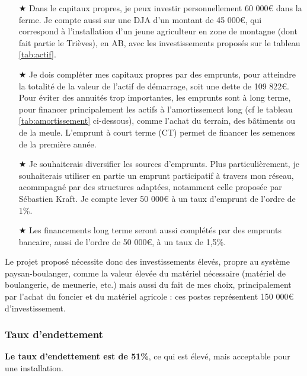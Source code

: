 \documentclass{book}
\begin{document}
\begin{itemize}

	\item[$\bigstar$] Dans le capitaux propres, je peux investir personnellement 60 000\euro{} dans la ferme. Je compte aussi sur une DJA d'un montant de 45 000\euro{}, qui correspond à l'installation d'un jeune agriculteur en zone de montagne (dont fait partie le Trièves), en AB, avec les investissements proposés sur le tableau \ref{tab:actif}.
	
	\item[$\bigstar$] Je dois compléter mes capitaux propres par des emprunts, pour atteindre la totalité de la valeur de l'actif de démarrage, soit une dette de 109 822\euro{}. Pour éviter des annuités trop importantes, les emprunts sont à long terme, pour financer principalement les actifs à l'amortissement long (cf le tableau \ref{tab:amortissement} ci-dessous), comme l'achat du terrain, des bâtiments ou de la meule. L'emprunt à court terme (CT) permet de financer les semences de la première année.
	
	\item[$\bigstar$] Je souhaiterais diversifier les sources d'emprunts. Plus particulièrement, je souhaiterais utiliser en partie un emprunt participatif à travers mon réseau, acommpagné par des structures adaptées, notamment celle proposée par Sébastien Kraft. Je compte lever 50 000\euro{} à un taux d'emprunt de l'ordre de 1\%.
	
	\item[$\bigstar$] Les financements long terme seront aussi complétés par des emprunts bancaire, aussi de l'ordre de 50 000\euro{}, à un taux de 1,5\%.

\end{itemize}

Le projet proposé nécessite donc des investissements élevés, propre au système paysan-boulanger, comme la valeur élevée du matériel nécessaire (matériel de boulangerie, de meunerie, etc.) mais aussi du fait de mes choix, principalement par l'achat du foncier et du matériel agricole : ces postes représentent 150 000\euro{} d'investissement.

\subsubsection{Taux d'endettement}

\textbf{Le taux d'endettement est de 51\%}, ce qui est élevé, mais acceptable pour une installation.
\end{document}
